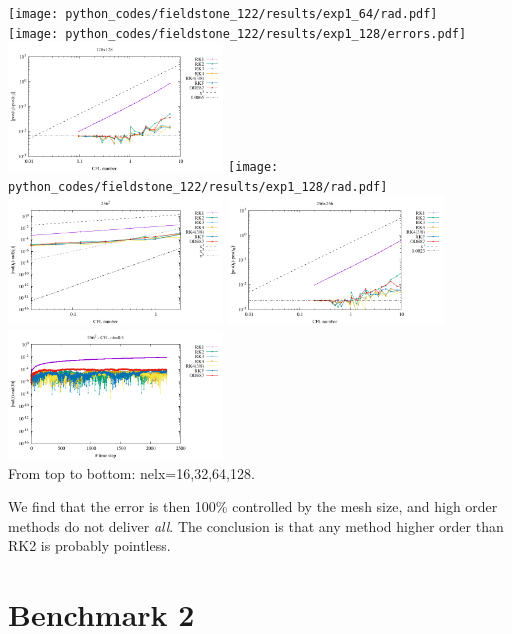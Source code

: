 \begin{center}
\texttt{[image: python\_codes/fieldstone\_122/results/exp1\_64/rad.pdf]}\\
\texttt{[image: python\_codes/fieldstone\_122/results/exp1\_128/errors.pdf]}
\includegraphics[width=5.7cm]{python_codes/fieldstone_122/results/exp1_128/errors2.pdf}
\texttt{[image: python\_codes/fieldstone\_122/results/exp1\_128/rad.pdf]}\\
\includegraphics[width=5.7cm]{python_codes/fieldstone_122/results/exp1_256/errors.pdf}
\includegraphics[width=5.7cm]{python_codes/fieldstone_122/results/exp1_256/errors2.pdf}
\includegraphics[width=5.7cm]{python_codes/fieldstone_122/results/exp1_256/rad.pdf}\\
{\captionfont From top to bottom: nelx=16,32,64,128.}
\end{center}

We find that the error is then 100\% controlled by the mesh size, and high order methods do 
not deliver {\it all}.
The conclusion is that any method higher order than RK2 is probably pointless. 


\section*{Benchmark 2}

